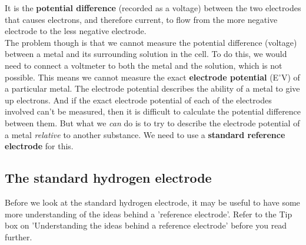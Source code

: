 It is the \textbf{potential difference} (recorded as a voltage) between the two electrodes that causes electrons, and therefore current, to flow from the more negative electrode to the less negative electrode.\\

The problem though is that we cannot measure the potential difference (voltage) between a metal and its surrounding solution in the cell. To do this, we would need to connect a voltmeter to both the metal and the solution, which is not possible. This means we cannot measure the exact \textbf{electrode potential} (E$^{\circ}$V) of a particular metal. The electrode potential describes the ability of a metal to give up electrons. And if the exact electrode potential of each of the electrodes involved can't be measured, then it is difficult to calculate the potential difference between them. But what we \textit{can} do is to try to describe the electrode potential of a metal \textit{relative} to another substance. We need to use a \textbf{standard reference electrode} for this.

\subsection{The standard hydrogen electrode}
\label{subsec:electrochemical:hydrogen electrode}

Before we look at the standard hydrogen electrode, it may be useful to have some more understanding of the ideas behind a 'reference electrode'. Refer to the Tip box on 'Understanding the ideas behind a reference electrode' before you read further.

